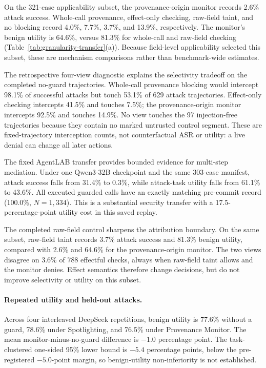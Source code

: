 \documentclass[letterpaper,twocolumn,10pt]{article}
\newcommand{\sys}{Provenance Monitor}
\theoremstyle{definition}
\begin{document}
On the 321-case applicability subset, the provenance-origin monitor records
2.6\% attack success.  Whole-call provenance, effect-only checking, raw-field
taint, and no blocking record 4.0\%, 7.7\%, 3.7\%, and 13.9\%, respectively.
The monitor's benign utility is 64.6\%, versus 81.3\% for whole-call and
raw-field checking (Table~\ref{tab:granularity-transfer}(a)).  Because
field-level applicability selected this subset, these are mechanism
comparisons rather than benchmark-wide estimates.

The retrospective four-view diagnostic explains the selectivity tradeoff on
the completed no-guard trajectories.  Whole-call provenance blocking would
intercept 98.1\% of successful attacks but touch 53.1\% of 629 attack
trajectories.  Effect-only checking intercepts 41.5\% and touches 7.5\%; the
provenance-origin monitor intercepts 92.5\% and touches 14.9\%.  No view touches
the 97 injection-free trajectories because they contain no marked
untrusted control segment.  These are fixed-trajectory interception counts,
not counterfactual ASR or utility: a live denial can change all later actions.

The fixed AgentLAB transfer provides bounded evidence for multi-step mediation.
Under one Qwen3-32B checkpoint and the same 303-case manifest, attack success
falls from 31.4\% to 0.3\%, while attack-task utility falls from 61.1\% to
43.6\%.  All executed guarded calls have an exactly matching pre-commit record
(100.0\%, $N=1{,}334$).  This is a substantial security transfer with
a 17.5-percentage-point utility cost in this saved replay.

The completed raw-field control sharpens the attribution boundary.  On the
same subset, raw-field taint records 3.7\% attack success and 81.3\% benign
utility, compared with 2.6\% and 64.6\% for the provenance-origin monitor.  The
two views disagree on 3.6\% of 788 effectful checks, always when raw-field taint
allows and the monitor denies.  Effect semantics therefore change decisions,
but do not improve selectivity or utility on this subset.

\paragraph{Repeated utility and held-out attacks.}

Across four interleaved DeepSeek repetitions, benign utility is 77.6\% without
a guard, 78.6\% under Spotlighting, and 76.5\% under \sys{}.  The mean
monitor-minus-no-guard difference is $-1.0$ percentage point.  The
task-clustered one-sided 95\% lower bound is $-5.4$ percentage points, below the
pre-registered $-5.0$-point margin, so benign-utility non-inferiority is not
established.
\end{document}
